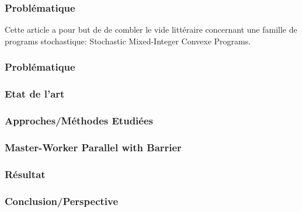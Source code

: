 \documentclass{beamer}
\begin{document}
    \begin{frame}
        \frametitle{}
    \end{frame}

    \begin{frame}
        \frametitle{Problématique}
        Cette article a pour but de de combler le vide littéraire concernant une famille de programs stochastique: Stochastic Mixed-Integer Convexe Programs.
    \end{frame}
        
    \begin{frame}
        \frametitle{Problématique}
        
    \end{frame}
        
    \begin{frame}
        \frametitle{Etat de l'art}
        
    \end{frame}
        
    \begin{frame}
        \frametitle{Approches/Méthodes Etudiées}
    \end{frame}
                
    \begin{frame}
        \frametitle{Master-Worker Parallel with Barrier}            
    \end{frame}
        
    \begin{frame}
        \frametitle{Résultat}
    \end{frame}
        
    \begin{frame}
        \frametitle{Conclusion/Perspective}
    \end{frame}

\end{document}
